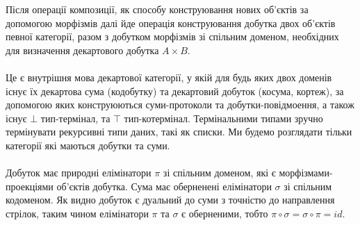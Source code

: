 Після операції композиції, як способу конструювання нових об’єктів
за допомогою морфізмів далі йде операція конструювання добутка двох об’єктів певної категорії,
разом з добутком морфізмів зі спільним доменом, необхідних для визначення декартового добутка $A \times B$.

\paragraph{}
Це є внутрішня мова декартової категорії, у якій для будь яких двох доменів існує їх декартова сума (кодобутку)
та декартовий добуток (косума, кортеж), за допомогою яких конструюються суми-протоколи та добутки-повідмоення,
а також існує $\bot$ тип-термінал, та $\top$ тип-котермінал. Термінальними типами зручно термінувати рекурсивні
типи даних, такі як списки. Ми будемо розглядати тільки категорії які маються добутки та суми.

\paragraph{}
Добуток має природні елімінатори $\pi$ зі спільним доменом, які є морфізмами-проекціями об’єктів добутка. Сума має оберненені
елімінатори $\sigma$ зі спільним кодоменом. Як видно добуток є дуальний до суми з точністю до направлення стрілок,
таким чином елімінатори $\pi$ та $\sigma$ є оберненими, тобто $\pi \circ \sigma = \sigma \circ \pi = id$.

